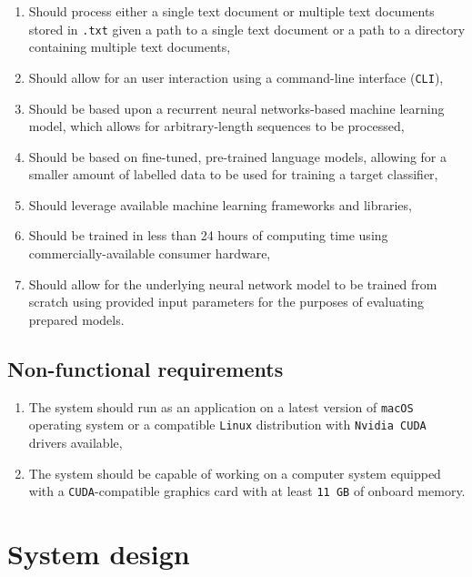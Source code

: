 \begin{enumerate}
    \item Should process either a single text document or multiple text documents stored in \lstinline{.txt} given a path to a single text document or a path to a directory containing multiple text documents,
    \item Should allow for an user interaction using a command-line interface (\lstinline{CLI}),
    \item Should be based upon a recurrent neural networks-based machine learning model, which allows for arbitrary-length sequences to be processed,
    \item Should be based on fine-tuned, pre-trained language models, allowing for a smaller amount of labelled data to be used for training a target classifier,
    \item Should leverage available machine learning frameworks and libraries,
    \item Should be trained in less than 24 hours of computing time using commercially-available consumer hardware,
    \item Should allow for the underlying neural network model to be trained from scratch using provided input parameters for the purposes of evaluating prepared models.
\end{enumerate}

\subsection{Non-functional requirements}
\label{requirements:non-functional}

\begin{enumerate}
    \item The system should run as an application on a latest version of \lstinline{macOS} operating system or a compatible \lstinline{Linux} distribution with \lstinline{Nvidia CUDA} drivers available,
    \item The system should be capable of working on a computer system equipped with a \lstinline{CUDA}-compatible graphics card with at least \lstinline{11 GB} of onboard memory.
\end{enumerate}

\section{System design}
\label{systemdesign}

